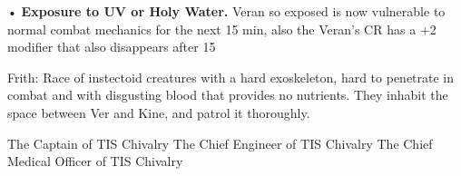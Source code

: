 \documentclass[blue]{guildcamp4}
\begin{document}
•	{\bf Exposure to UV or Holy Water.} Veran so exposed is now vulnerable to normal combat mechanics for the next 15 min, also the Veran's CR has a +2 modifier that also disappears after 15

Frith: Race of instectoid creatures with a hard exoskeleton, hard to penetrate in combat and with disgusting blood that provides no nutrients. They inhabit the space between Ver and Kine, and patrol it thoroughly.






\begin{members}
	\member{\cVone{}} The Captain of TIS Chivalry
	\member{\cVtwo{}} The Chief Engineer of TIS Chivalry
	\member{\cVthree{}} The Chief Medical Officer of TIS Chivalry

\end{members}
\end{document}
